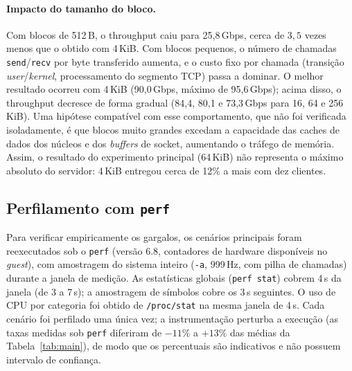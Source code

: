 \documentclass[12pt,a4paper]{article}
\newcommand{\SI}[2]{\mbox{#1\,#2}}
\begin{document}
\paragraph{Impacto do tamanho do bloco.} Com blocos de \SI{512}{B}, o
throughput caiu para \SI{25{,}8}{Gbps}, cerca de $3{,}5$ vezes menos que o
obtido com \SI{4}{KiB}. Com blocos pequenos, o número de chamadas
\texttt{send}/\texttt{recv} por byte transferido aumenta, e o custo fixo por
chamada (transição \textit{user}/\textit{kernel}, processamento do segmento TCP)
passa a dominar. O melhor resultado ocorreu com \SI{4}{KiB}
(\SI{90{,}0}{Gbps}, máximo de \SI{95{,}6}{Gbps}); acima disso, o throughput decresce
de forma gradual (84,4, 80,1 e \SI{73{,}3}{Gbps} para 16, 64 e
\SI{256}{KiB}). Uma hipótese compatível com esse comportamento, que não foi
verificada isoladamente, é que blocos muito grandes
excedam a capacidade das caches de dados dos núcleos e dos \textit{buffers} de
socket, aumentando o tráfego de memória. Assim, o resultado do experimento
principal (\SI{64}{KiB}) não representa o máximo absoluto do servidor:
\SI{4}{KiB} entregou cerca de 12\% a mais com dez clientes.

\subsection{Perfilamento com \texttt{perf}}

Para verificar empiricamente os gargalos, os cenários principais foram
reexecutados sob o \texttt{perf} (versão 6.8, contadores de hardware
disponíveis no \textit{guest}), com amostragem do sistema inteiro
(\texttt{-a}, \SI{999}{Hz}, com pilha de chamadas) durante a janela de medição.
As estatísticas globais (\texttt{perf stat}) cobrem \SI{4}{s} da janela
(de 3 a \SI{7}{s}); a amostragem de símbolos cobre os \SI{3}{s} seguintes. O uso
de CPU por categoria foi obtido de \texttt{/proc/stat} na mesma janela de
\SI{4}{s}. Cada cenário foi perfilado uma única vez; a instrumentação
perturba a execução (as taxas medidas sob \texttt{perf} diferiram de $-11\%$ a
$+13\%$ das médias da Tabela~\ref{tab:main}), de modo que os percentuais são
indicativos e não possuem intervalo de confiança.
\end{document}
